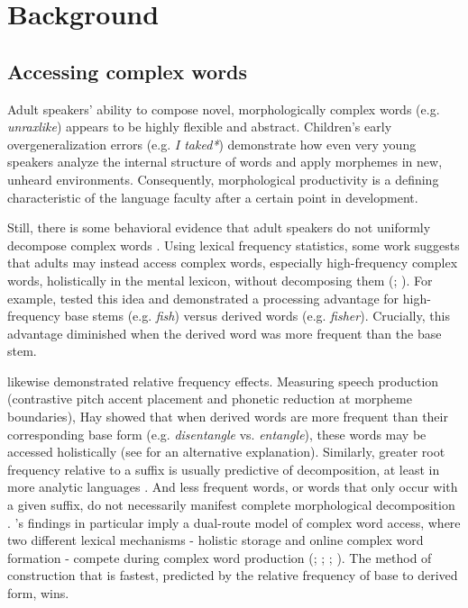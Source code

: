 \documentclass[a4paper,man,floatsintext,natbib,donotrepeattitle, apacite]{apa6}
\begin{document}
\section{Background}


\subsection{Accessing complex words}

Adult speakers’ ability to compose novel, morphologically complex words (e.g. \textit{unraxlike}) appears to be highly flexible and abstract. Children’s early overgeneralization errors (e.g. \textit{I taked*}) demonstrate how even very young speakers analyze the internal structure of words and apply morphemes in new, unheard environments. Consequently, morphological productivity is a defining characteristic of the language faculty after a certain point in development. 

Still, there is some behavioral evidence that adult speakers do not uniformly decompose complex words \citep{taftLexicalStorageRetrieval1976}. 
Using lexical frequency statistics, some work suggests that adults may instead access complex words, especially high-frequency complex words, holistically in the mental lexicon, without decomposing them (\citealt{baayenQuantitativeAspectsMorphological1992}; \citealt{baayenFrequencyEffectsRegular2003}). For example, \citet{coleWordsMorphemesUnits1997} tested this idea and demonstrated a processing advantage for high-frequency base stems (e.g. \textit{fish}) versus derived words (e.g. \textit{fisher}). Crucially, this advantage diminished when the derived word was more frequent than the base stem. 

\citet{hayCausesConsequencesWord2003} likewise demonstrated relative frequency effects. Measuring speech production (contrastive pitch accent placement and phonetic reduction at morpheme boundaries), Hay showed that when derived words are more frequent than their corresponding base form (e.g. \textit{disentangle} vs. \textit{entangle}), these words may be accessed holistically (see \citealt{pluymaekersMorphologicalEffectsFine2010} for an alternative explanation). Similarly, greater root frequency relative to a suffix is usually predictive of decomposition, at least in more analytic languages \citep{smithPhoneticDetailThat2012}. And less frequent words, or words that only occur with a given suffix, do not necessarily manifest complete morphological decomposition \citep{kempsProsodicCuesMorphological2005}. 
\citet{hayCausesConsequencesWord2003}'s findings in particular imply a dual-route model of complex word access, where two different lexical mechanisms - holistic storage and online complex word formation - compete during complex word production (\citealt{baayenQuantitativeAspectsMorphological1992}; \citealt{koenigTypeUnderspecificationOnline1995}; \citealt{pinkerRegularIrregularMorphology1994}; \citealt{pinkerFutureTense2002}). The method of construction that is fastest, predicted by the relative frequency of base to derived form, wins. 
\end{document}
